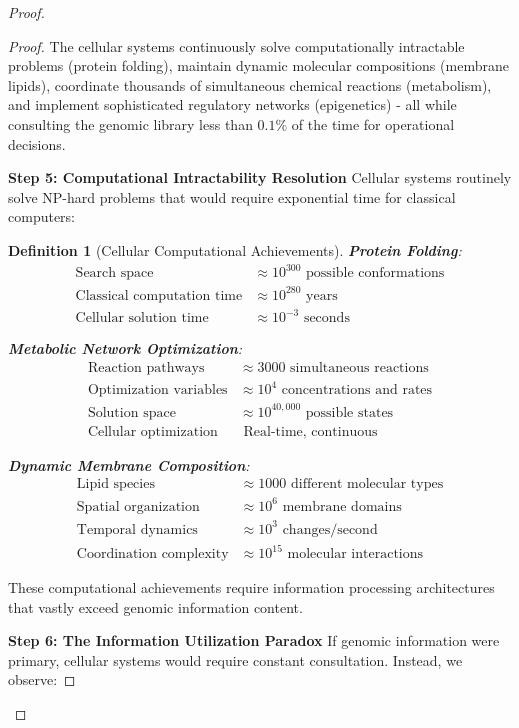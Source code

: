 \documentclass[12pt,a4paper]{article}
\newtheorem{definition}[theorem]{Definition}
\begin{document}
\begin{proof}
\begin{proof}
The cellular systems continuously solve computationally intractable problems (protein folding), maintain dynamic molecular compositions (membrane lipids), coordinate thousands of simultaneous chemical reactions (metabolism), and implement sophisticated regulatory networks (epigenetics) - all while consulting the genomic library less than $0.1\%$ of the time for operational decisions.

\textbf{Step 5: Computational Intractability Resolution}
Cellular systems routinely solve NP-hard problems that would require exponential time for classical computers:

\begin{definition}[Cellular Computational Achievements]
\textbf{Protein Folding}:
\begin{align}
\text{Search space} &\approx 10^{300} \text{ possible conformations} \\
\text{Classical computation time} &\approx 10^{280} \text{ years} \\
\text{Cellular solution time} &\approx 10^{-3} \text{ seconds}
\end{align}

\textbf{Metabolic Network Optimization}:
\begin{align}
\text{Reaction pathways} &\approx 3000 \text{ simultaneous reactions} \\
\text{Optimization variables} &\approx 10^4 \text{ concentrations and rates} \\
\text{Solution space} &\approx 10^{40,000} \text{ possible states} \\
\text{Cellular optimization} &\text{ Real-time, continuous}
\end{align}

\textbf{Dynamic Membrane Composition}:
\begin{align}
\text{Lipid species} &\approx 1000 \text{ different molecular types} \\
\text{Spatial organization} &\approx 10^6 \text{ membrane domains} \\
\text{Temporal dynamics} &\approx 10^3 \text{ changes/second} \\
\text{Coordination complexity} &\approx 10^{15} \text{ molecular interactions}
\end{align}
\end{definition}

These computational achievements require information processing architectures that vastly exceed genomic information content.

\textbf{Step 6: The Information Utilization Paradox}
If genomic information were primary, cellular systems would require constant consultation. Instead, we observe:


\end{proof}
\end{proof}
\end{document}
